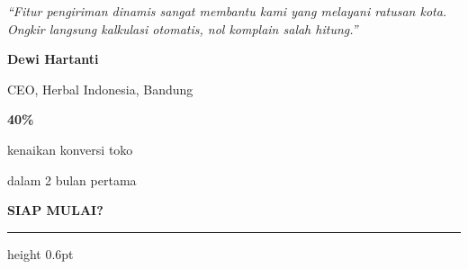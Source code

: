 \documentclass[a4paper]{article}
\newcommand{\sectiontitle}[1]{%
    \vspace{10pt}%
    {\fontsize{13}{16}\selectfont\bfseries\color{BlueDark} #1}\par\vspace{3pt}%
    {\color{BluePrimary}\hrule height 0.6pt}\par\vspace{8pt}%
}
\begin{document}
\noindent
\begin{minipage}[t]{0.485\textwidth}
    \colorbox{BlueBg}{%
        \begin{minipage}{\dimexpr\linewidth-2\fboxsep\relax}
            {\fontsize{9.5}{13}\selectfont\color{TextDark}\textit{``Fitur pengiriman dinamis sangat membantu kami yang melayani ratusan kota. Ongkir langsung kalkulasi otomatis, nol komplain salah hitung.''}}\par\vspace{4pt}
            {\fontsize{8.5}{11}\selectfont\bfseries\color{BluePrimary} Dewi Hartanti}\par
            {\fontsize{8}{10}\selectfont\color{TextLight} CEO, Herbal Indonesia, Bandung}
        \end{minipage}}
\end{minipage}%
\hfill
\begin{minipage}[t]{0.485\textwidth}
    \colorbox{BlueBg}{%
        \begin{minipage}{\dimexpr\linewidth-2\fboxsep\relax}
            \begin{center}
                {\fontsize{20}{24}\selectfont\bfseries\color{BluePrimary} 40\%}\par
                {\fontsize{9.5}{12}\selectfont\color{TextDark} kenaikan konversi toko}\par
                {\fontsize{9.5}{12}\selectfont\color{TextDark} dalam 2 bulan pertama}
            \end{center}
        \end{minipage}}
\end{minipage}

\sectiontitle{SIAP MULAI?}
\end{document}
